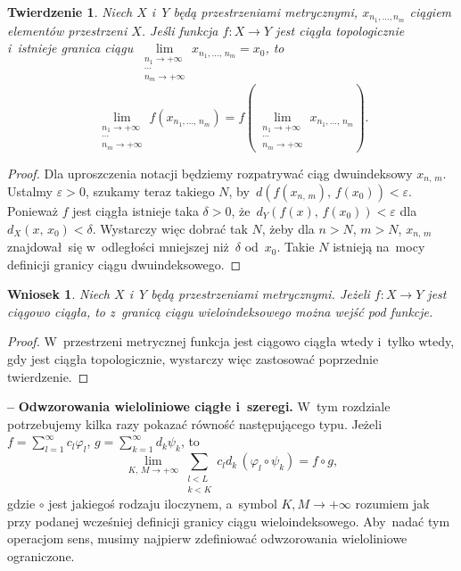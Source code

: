 \documentclass[a4paper,11pt]{article}
\newtheorem{twr}{Twierdzenie}
\newtheorem{wni}{Wniosek}%
\newcommand{\ld}{\ldots}
\newcommand{\ra}{\rightarrow}
\newcommand{\wtw}{wtedy i~tylko wtedy}
\newcommand{\del}{\delta}
\newcommand{\veps}{\varepsilon}
\newcommand{\vp}{\varphi}
\newcommand{\Lim}{\lim\limits}
\newcommand{\Sum}{\sum\limits}
\newcommand{\tb}{\textbf}
\newcommand{\noi}{\noindent}
\newcommand{\start}{\noi \tb{--} {}}
\newcommand{\ci}{\circ}
\begin{document}
\begin{twr}
  Niech $X$ i~$Y$ będą przestrzeniami metrycznymi,
  $x_{ n_{ 1 }, \ld, n_{ m } }$ ciągiem elementów przestrzeni $X$.
  Jeśli funkcja $f: X \ra Y$ jest ciągła topologicznie i~istnieje
  granica ciągu
  $\Lim_{ \substack{ n_{ 1 } \ra +\infty \\ \cdots \\ n_{ m } \ra
      +\infty } } x_{ n_{ 1 }, \ld, \, n_{ m } } = x_{ 0 }$, to
  \begin{equation}
    \Lim_{ \substack{ n_{ 1 } \ra +\infty \\ \cdots \\  n_{ m } \ra +\infty } }
    f( x_{ n_{ 1 }, \ld, \, n_{ m } } )
    = f( \Lim_{ \substack{ n_{ 1 } \ra +\infty \\ \cdots \\ n_{ m } \ra
        +\infty } } x_{ n_{ 1 }, \ld, \, n_{ m } } ).
  \end{equation}
\end{twr}

\begin{proof}
  Dla uproszczenia notacji będziemy rozpatrywać ciąg dwuindeksowy
  $x_{ n, \, m }$. Ustalmy $\veps > 0$, szukamy teraz takiego $N$,
  by~$d( f( x_{ n, \, m } ),\, f( x_{ 0 } ) ) < \veps$. Ponieważ $f$
  jest ciągła istnieje taka $\del > 0$, \linebreak
  że~$d_{ Y }( f( x ),\, f( x_{ 0 } ) ) < \veps$
  dla~$d_{ X }( x,\, x_{ 0 } ) < \del$. Wystarczy więc dobrać tak $N$,
  żeby dla $n > N$, $m > N$, $x_{ n, \, m }$ znajdował~się
  w~odległości mniejszej niż~$\del$ od~$x_{ 0 }$. Takie $N$ istnieją
  na~mocy definicji granicy ciągu dwuindeksowego.
\end{proof}

\begin{wni}
  Niech $X$ i~$Y$ będą przestrzeniami metrycznymi. Jeżeli $f: X \ra Y$
  jest ciągowo ciągła, to z~granicą ciągu wieloindeksowego można wejść
  pod funkcje.
\end{wni}

\begin{proof}
  W~przestrzeni metrycznej funkcja jest ciągowo ciągła \wtw, gdy jest
  ciągła topologicznie, wystarczy więc zastosować poprzednie
  twierdzenie.
\end{proof}

\start \tb{Odwzorowania wieloliniowe ciągłe i~szeregi.} W~tym
rozdziale potrzebujemy kilka razy pokazać równość następującego typu.
Jeżeli $f = \sum_{ l = 1 }^{ \infty } c_{ l } \vp_{ l }$,
$g = \sum_{ k = 1 }^{ \infty } d_{ k } \psi_{ k }$, to
\begin{equation*}
  \Lim_{ K,\, M \ra +\infty } \Sum_{ \substack{ l < L \\ k < K } }
  c_{ l } d_{ k } \, (\vp_{ l } \ci \psi_{ k } ) = f \ci g,
\end{equation*}
gdzie $\ci$ jest jakiegoś rodzaju iloczynem, a~symbol
$K, M \ra +\infty$ rozumiem jak przy podanej wcześniej definicji
granicy ciągu wieloindeksowego. Aby~nadać tym operacjom sens, musimy
najpierw zdefiniować odwzorowania wieloliniowe ograniczone.
\end{document}
